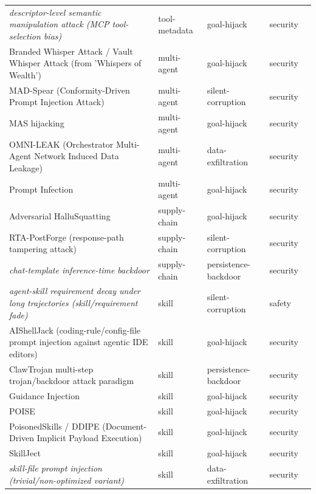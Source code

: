 \begin{longtable}{@{}p{}llll@{}}
\emph{descriptor-level semantic manipulation attack (MCP tool-selection bias)} & tool-metadata & goal-hijack & security & \cite{jamshidi-2025-semantic} \\
Branded Whisper Attack / Vault Whisper Attack (from 'Whispers of Wealth') & multi-agent & goal-hijack & security & \cite{debi-2026-whispers} \\
MAD-Spear (Conformity-Driven Prompt Injection Attack) & multi-agent & silent-corruption & security & \cite{cui-2025-madspear} \\
MAS hijacking & multi-agent & goal-hijack & security & \cite{triedman-2025-multiagent} \\
OMNI-LEAK (Orchestrator Multi-Agent Network Induced Data Leakage) & multi-agent & data-exfiltration & security & \cite{naik-2026-omnileak} \\
Prompt Infection & multi-agent & goal-hijack & security & \cite{lee-2025-prompt} \\
Adversarial HalluSquatting & supply-chain & goal-hijack & security & \cite{spira-2026-beware} \\
RTA-PostForge (response-path tampering attack) & supply-chain & silent-corruption & security & \cite{luo-2026-rewriting} \\
\emph{chat-template inference-time backdoor} & supply-chain & persistence-backdoor & security & \cite{fogel-2026-inferencetime} \\
\emph{agent-skill requirement decay under long trajectories (skill/requirement fade)} & skill & silent-corruption & safety & \cite{xue-2026-agent} \\
AIShellJack (coding-rule/config-file prompt injection against agentic IDE editors) & skill & goal-hijack & security & \cite{liu-2025-your} \\
ClawTrojan multi-step trojan/backdoor attack paradigm & skill & persistence-backdoor & security & \cite{tan-2026-prompt} \\
Guidance Injection & skill & goal-hijack & security & \cite{liu-2026-trojan} \\
POISE & skill & goal-hijack & security & \cite{hao-2026-poise} \\
PoisonedSkills / DDIPE (Document-Driven Implicit Payload Execution) & skill & goal-hijack & security & \cite{qu-2026-supplychain} \\
SkillJect & skill & goal-hijack & security & \cite{jia-2026-skillject} \\
\emph{skill-file prompt injection (trivial/non-optimized variant)} & skill & data-exfiltration & security & \cite{schmotz-2025-agent} \\
\end{longtable}
\endgroup

